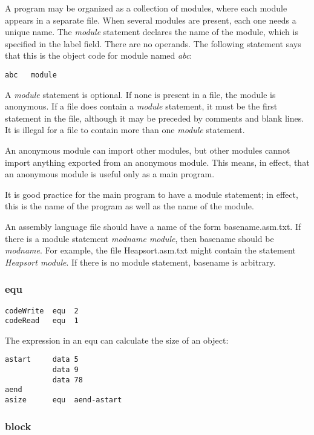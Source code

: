 \documentclass[11pt]{article}
\begin{document}
A program may be organized as a collection of modules, where each
module appears in a separate file.  When several modules are present,
each one needs a unique name.  The \emph{module} statement declares the
name of the module, which is specified in the label field.  There are
no operands.  The following statement says that this is the object
code for module named \emph{abc}:

\begin{verbatim}
abc   module 
\end{verbatim}

A \emph{module} statement is optional.  If none is present in a file, the
module is anonymous.  If a file does contain a \emph{module} statement, it
must be the first statement in the file, although it may be preceded
by comments and blank lines.  It is illegal for a file to contain more
than one \emph{module} statement.

An anonymous module can import other modules, but other modules cannot
import anything exported from an anonymous module.  This means, in
effect, that an anonymous module is useful only as a main program.

It is good practice for the main program to have a module statement;
in effect, this is the name of the program as well as the name of the
module.

An assembly language file should have a name of the form
basename.asm.txt.  If there is a module statement \emph{modname module},
then basename should be \emph{modname}.  For example, the file
Heapsort.asm.txt might contain the statement \emph{Heapsort module}.  If
there is no module statement, basename is arbitrary.

\subsubsection*{equ}
\label{sec:org39da7a1}

\begin{verbatim}
codeWrite  equ  2
codeRead   equ  1
\end{verbatim}

The expression in an equ can calculate the size of an object:

\begin{verbatim}
astart     data 5
           data 9
           data 78
aend
asize      equ  aend-astart
\end{verbatim}

\subsubsection*{block}
\label{sec:orge246531}
\end{document}
